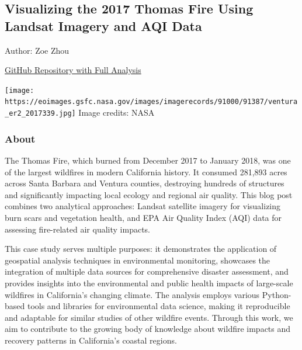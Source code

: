 \documentclass[
  letterpaper,
  DIV=11,
  numbers=noendperiod]{scrartcl}
\author{}
\date{}
\begin{document}
\ifdefined\Shaded\renewenvironment{Shaded}{\begin{tcolorbox}[interior hidden, borderline west={3pt}{0pt}{shadecolor}, frame hidden, sharp corners, enhanced, boxrule=0pt, breakable]}{\end{tcolorbox}}\fi

\hypertarget{visualizing-the-2017-thomas-fire-using-landsat-imagery-and-aqi-data}{%
\subsection{Visualizing the 2017 Thomas Fire Using Landsat Imagery and
AQI
Data}\label{visualizing-the-2017-thomas-fire-using-landsat-imagery-and-aqi-data}}

Author: Zoe Zhou

\href{https://github.com/ZoeZhouJ/eds220-hwk4.git}{GitHub Repository
with Full Analysis}

\texttt{[image: https://eoimages.gsfc.nasa.gov/images/imagerecords/91000/91387/ventura\_er2\_2017339.jpg]}
Image credits: NASA

\hypertarget{about}{%
\subsubsection{About}\label{about}}

The Thomas Fire, which burned from December 2017 to January 2018, was
one of the largest wildfires in modern California history. It consumed
281,893 acres across Santa Barbara and Ventura counties, destroying
hundreds of structures and significantly impacting local ecology and
regional air quality. This blog post combines two analytical approaches:
Landsat satellite imagery for visualizing burn scars and vegetation
health, and EPA Air Quality Index (AQI) data for assessing fire-related
air quality impacts.

This case study serves multiple purposes: it demonstrates the
application of geospatial analysis techniques in environmental
monitoring, showcases the integration of multiple data sources for
comprehensive disaster assessment, and provides insights into the
environmental and public health impacts of large-scale wildfires in
California's changing climate. The analysis employs various Python-based
tools and libraries for environmental data science, making it
reproducible and adaptable for similar studies of other wildfire events.
Through this work, we aim to contribute to the growing body of knowledge
about wildfire impacts and recovery patterns in California's coastal
regions.
\end{document}
